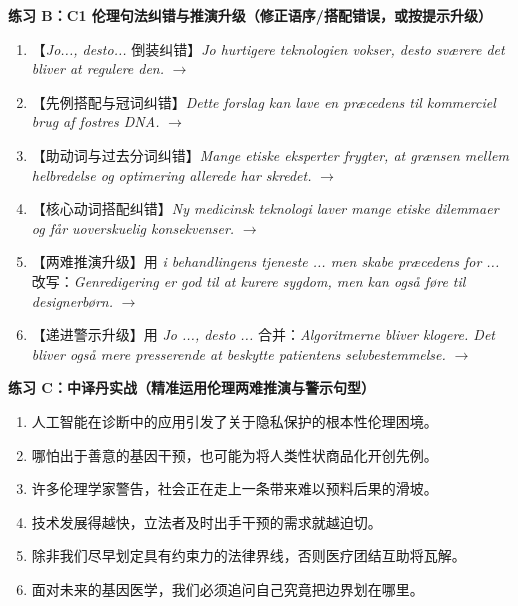 \textbf{练习 B：C1 伦理句法纠错与推演升级（修正语序/搭配错误，或按提示升级）}
\begin{enumerate}
  \item 【\textit{Jo..., desto...} 倒装纠错】\textit{Jo hurtigere teknologien vokser, desto sværere det bliver at regulere den.} $\rightarrow$
  \item 【先例搭配与冠词纠错】\textit{Dette forslag kan lave en præcedens til kommerciel brug af fostres DNA.} $\rightarrow$
  \item 【助动词与过去分词纠错】\textit{Mange etiske eksperter frygter, at grænsen mellem helbredelse og optimering allerede har skredet.} $\rightarrow$
  \item 【核心动词搭配纠错】\textit{Ny medicinsk teknologi laver mange etiske dilemmaer og får uoverskuelig konsekvenser.} $\rightarrow$
  \item 【两难推演升级】用 \textit{i behandlingens tjeneste ... men skabe præcedens for ...} 改写：\textit{Genredigering er god til at kurere sygdom, men kan også føre til designerbørn.} $\rightarrow$
  \item 【递进警示升级】用 \textit{Jo ..., desto ...} 合并：\textit{Algoritmerne bliver klogere. Det bliver også mere presserende at beskytte patientens selvbestemmelse.} $\rightarrow$
\end{enumerate}

\textbf{练习 C：中译丹实战（精准运用伦理两难推演与警示句型）}
\begin{enumerate}
  \item 人工智能在诊断中的应用引发了关于隐私保护的根本性伦理困境。
  \item 哪怕出于善意的基因干预，也可能为将人类性状商品化开创先例。
  \item 许多伦理学家警告，社会正在走上一条带来难以预料后果的滑坡。
  \item 技术发展得越快，立法者及时出手干预的需求就越迫切。
  \item 除非我们尽早划定具有约束力的法律界线，否则医疗团结互助将瓦解。
  \item 面对未来的基因医学，我们必须追问自己究竟把边界划在哪里。
\end{enumerate}


